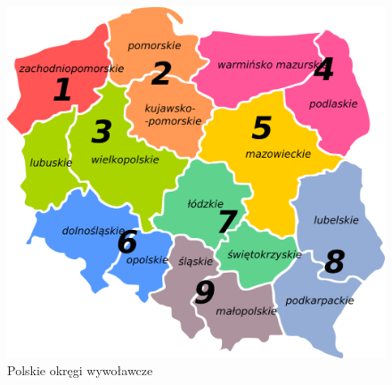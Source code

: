 \documentclass[a4paper,11pt]{article}
\begin{document}
\begin{figure}[p]
\includegraphics{Polish_HAM_Radio_Regions}
\caption{Polskie okręgi wywoławcze}
\end{figure}
\end{document}
